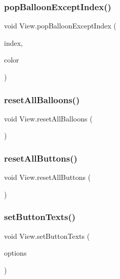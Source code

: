 \subsubsection{\texorpdfstring{pop\+Balloon\+Except\+Index()}{popBalloonExceptIndex()}}
{\footnotesize\ttfamily void View.\+pop\+Balloon\+Except\+Index (\begin{DoxyParamCaption}\item[{int}]{index,  }\item[{Color}]{color }\end{DoxyParamCaption})\hspace{0.3cm}{\ttfamily [inline]}}

\mbox{\label{classView_a00bad032ce14da298bf9ab08fe13fd35}} 
\subsubsection{\texorpdfstring{reset\+All\+Balloons()}{resetAllBalloons()}}
{\footnotesize\ttfamily void View.\+reset\+All\+Balloons (\begin{DoxyParamCaption}{ }\end{DoxyParamCaption})\hspace{0.3cm}{\ttfamily [inline]}}

\mbox{\label{classView_a8586560027cd5d93aaf70d494c0189b4}} 
\subsubsection{\texorpdfstring{reset\+All\+Buttons()}{resetAllButtons()}}
{\footnotesize\ttfamily void View.\+reset\+All\+Buttons (\begin{DoxyParamCaption}{ }\end{DoxyParamCaption})\hspace{0.3cm}{\ttfamily [inline]}}

\mbox{\label{classView_aa0b0a3a9e4ae68745de1870b4f85433e}} 
\subsubsection{\texorpdfstring{set\+Button\+Texts()}{setButtonTexts()}}
{\footnotesize\ttfamily void View.\+set\+Button\+Texts (\begin{DoxyParamCaption}\item[{Array\+List}]{options }\end{DoxyParamCaption})\hspace{0.3cm}{\ttfamily [inline]}}

